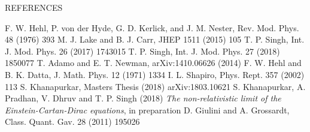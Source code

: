 \documentclass[prd, preprint, 12pt]{revtex4-1}
\begin{document}
\bigskip
\bigskip

\centerline{REFERENCES}
\begin{thebibliography}{99}
 F. W. Hehl, P. von der Hyde, G. D. Kerlick, and J. M. Nester, Rev. Mod. Phys. 48 (1976) 393 
 M. J. Lake and B. J. Carr, JHEP 1511 (2015) 105
 T. P. Singh, Int. J. Mod. Phys. 26 (2017) 1743015
 T. P. Singh, Int. J. Mod. Phys. 27 (2018) 1850077
 T. Adamo and E. T. Newman, arXiv:1410.06626 (2014)
 F. W. Hehl and B. K. Datta, J. Math. Phys. 12 (1971) 1334
 I. L. Shapiro, Phys. Rept. 357 (2002) 113
 S. Khanapurkar, Masters Thesis (2018) arXiv:1803.10621
 S. Khanapurkar, A. Pradhan, V. Dhruv and T. P. Singh (2018) {\it The non-relativistic limit of the Einstein-Cartan-Dirac equations}, in preparation
 D. Giulini and A. Grossardt, Class. Quant. Gav. 28 (2011) 195026
\end{thebibliography}

 
\end{document}
